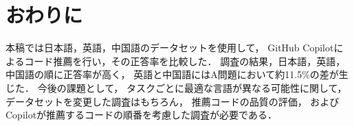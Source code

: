 \section{おわりに\label{conclusion}}
  本稿では日本語，英語，中国語のデータセットを使用して，
  GitHub Copilotによるコード推薦を行い，その正答率を比較した．
  調査の結果，日本語，英語，中国語の順に正答率が高く，
  英語と中国語にはA問題において約11.5\%の差が生じた．
  今後の課題として，
  タスクごとに最適な言語が異なる可能性に関して，
  データセットを変更した調査はもちろん，
  推薦コードの品質の評価，
  およびCopilotが推薦するコードの順番を考慮した調査が必要である．
  